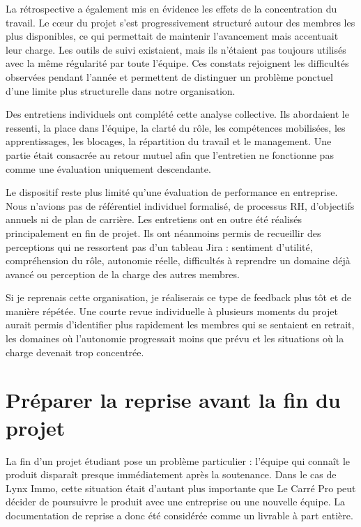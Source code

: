 La rétrospective a également mis en évidence les effets de la concentration du travail. Le cœur du projet s'est progressivement structuré autour des membres les plus disponibles, ce qui permettait de maintenir l'avancement mais accentuait leur charge. Les outils de suivi existaient, mais ils n'étaient pas toujours utilisés avec la même régularité par toute l'équipe. Ces constats rejoignent les difficultés observées pendant l'année et permettent de distinguer un problème ponctuel d'une limite plus structurelle dans notre organisation.

Des entretiens individuels ont complété cette analyse collective. Ils abordaient le ressenti, la place dans l'équipe, la clarté du rôle, les compétences mobilisées, les apprentissages, les blocages, la répartition du travail et le management. Une partie était consacrée au retour mutuel afin que l'entretien ne fonctionne pas comme une évaluation uniquement descendante.

Le dispositif reste plus limité qu'une évaluation de performance en entreprise. Nous n'avions pas de référentiel individuel formalisé, de processus RH, d'objectifs annuels ni de plan de carrière. Les entretiens ont en outre été réalisés principalement en fin de projet. Ils ont néanmoins permis de recueillir des perceptions qui ne ressortent pas d'un tableau Jira : sentiment d'utilité, compréhension du rôle, autonomie réelle, difficultés à reprendre un domaine déjà avancé ou perception de la charge des autres membres.

Si je reprenais cette organisation, je réaliserais ce type de feedback plus tôt et de manière répétée. Une courte revue individuelle à plusieurs moments du projet aurait permis d'identifier plus rapidement les membres qui se sentaient en retrait, les domaines où l'autonomie progressait moins que prévu et les situations où la charge devenait trop concentrée.

\section{Préparer la reprise avant la fin du projet}

La fin d'un projet étudiant pose un problème particulier : l'équipe qui connaît le produit disparaît presque immédiatement après la soutenance. Dans le cas de Lynx Immo, cette situation était d'autant plus importante que Le Carré Pro peut décider de poursuivre le produit avec une entreprise ou une nouvelle équipe. La documentation de reprise a donc été considérée comme un livrable à part entière.

